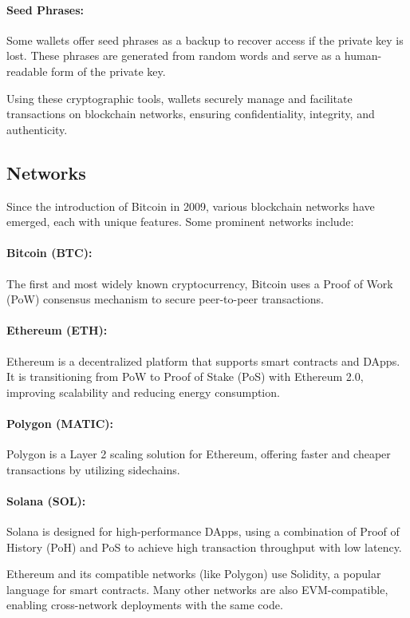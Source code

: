 \paragraph{Seed Phrases:}
Some wallets offer seed phrases as a backup to recover access if the private
key is lost. These phrases are generated from random words and serve as a
human-readable form of the private key.

Using these cryptographic tools, wallets securely manage and facilitate
transactions on blockchain networks, ensuring confidentiality, integrity, and
authenticity.

\subsection{Networks}
\label{subsec:networks}

Since the introduction of Bitcoin in 2009, various blockchain networks have
emerged, each with unique features. Some prominent networks include:

\paragraph{Bitcoin (BTC):}
The first and most widely known cryptocurrency, Bitcoin uses a Proof of Work
(PoW) consensus mechanism to secure peer-to-peer transactions.

\paragraph{Ethereum (ETH):}
Ethereum is a decentralized platform that supports smart contracts and DApps.
It is transitioning from PoW to Proof of Stake (PoS) with Ethereum 2.0,
improving scalability and reducing energy consumption.

\paragraph{Polygon (MATIC):}
Polygon is a Layer 2 scaling solution for Ethereum, offering faster and cheaper
transactions by utilizing sidechains.

\paragraph{Solana (SOL):}
Solana is designed for high-performance DApps, using a combination of Proof of
History (PoH) and PoS to achieve high transaction throughput with low latency.

Ethereum and its compatible networks (like Polygon) use Solidity, a popular
language for smart contracts. Many other networks are also EVM-compatible,
enabling cross-network deployments with the same code.


